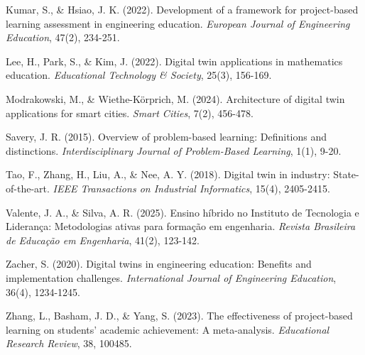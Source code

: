 \documentclass[english, spanish, brazilian]{modelo_dt}
\begin{document}
\noindent
Kumar, S., \& Hsiao, J. K. (2022). Development of a framework for project-based learning assessment in engineering education. \textit{European Journal of Engineering Education}, 47(2), 234-251.

\noindent
Lee, H., Park, S., \& Kim, J. (2022). Digital twin applications in mathematics education. \textit{Educational Technology \& Society}, 25(3), 156-169.

\noindent
Modrakowski, M., \& Wiethe-Körprich, M. (2024). Architecture of digital twin applications for smart cities. \textit{Smart Cities}, 7(2), 456-478.

\noindent
Savery, J. R. (2015). Overview of problem-based learning: Definitions and distinctions. \textit{Interdisciplinary Journal of Problem-Based Learning}, 1(1), 9-20.

\noindent
Tao, F., Zhang, H., Liu, A., \& Nee, A. Y. (2018). Digital twin in industry: State-of-the-art. \textit{IEEE Transactions on Industrial Informatics}, 15(4), 2405-2415.

\noindent
Valente, J. A., \& Silva, A. R. (2025). Ensino híbrido no Instituto de Tecnologia e Liderança: Metodologias ativas para formação em engenharia. \textit{Revista Brasileira de Educação em Engenharia}, 41(2), 123-142.

\noindent
Zacher, S. (2020). Digital twins in engineering education: Benefits and implementation challenges. \textit{International Journal of Engineering Education}, 36(4), 1234-1245.

\noindent
Zhang, L., Basham, J. D., \& Yang, S. (2023). The effectiveness of project-based learning on students' academic achievement: A meta-analysis. \textit{Educational Research Review}, 38, 100485.
\end{document}
